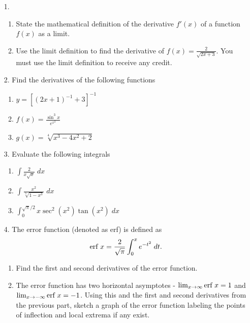 \documentclass[11pt,reqno]{article}
\theoremstyle{definition}
\begin{document}
	\begin{enumerate}
		\item[1.] 
		\begin{enumerate}
			
			\item State the mathematical definition of the derivative $f'(x)$ of a function $f(x)$ as a limit.
			
			\vspace{1.5in}
			
			\item Use the limit definition to find the derivative of $f(x)=\frac{2}{\sqrt{2x+3}}$. You must use the limit definition to receive any credit.
			
		\end{enumerate}
		\newpage
		\item[2.] Find the derivatives of the following functions
		\begin{enumerate}
			\item $y = [(2x + 1)^{-1} + 3]^{-1}$
			\vspace{5 cm}
			\item $f(x) = \frac{\sin^3 x}{e^{x^2}}$ 
			\vspace{10cm}
			\item $g(x) = \sqrt[4]{x^3 - 4x^2 + 2}$
		\end{enumerate}
		\newpage
		\item[3.] Evaluate the following integrals
			\begin{enumerate}
				\item $\int \frac{2}{x\sqrt{x}} \; dx$ 
				\vspace{4cm}
				\item $\int \frac{x^2}{\sqrt[3]{1 - x^3}} \; dx$
				\vspace{6cm}
				\item $\int_{0}^{\sqrt{\pi}/2} x \sec^2 (x^2) \tan(x^2) \;dx$
			\end{enumerate}
		\newpage
		\item[4.] The error function (denoted as erf) is defined as $$\textnormal{erf }x = \frac{2}{\sqrt{\pi}} \int_{0}^{x} e^{-t^2} \; dt.$$ 
		\begin{enumerate}
			\item Find the first and second derivatives of the error function.
			\vspace{5cm}
			\item The error function has two horizontal asymptotes - $\lim_{x \to \infty} \textnormal{erf } x = 1$ and $\lim_{x \to -\infty} \textnormal{erf } x = -1$. Using this and the first and second derivatives from the previous part, sketch a graph of the error function labeling the points of inflection and local extrema if any exist.

\end{enumerate}
\end{enumerate}
\end{document}

